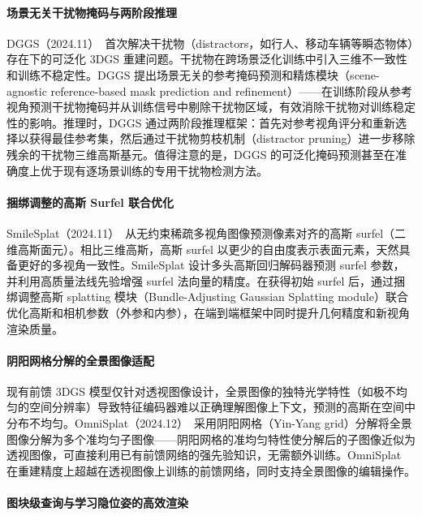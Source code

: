 \paragraph{场景无关干扰物掩码与两阶段推理}

DGGS（2024.11）~\cite{2411_17605}首次解决干扰物（distractors，如行人、移动车辆等瞬态物体）存在下的可泛化 3DGS 重建问题。干扰物在跨场景泛化训练中引入三维不一致性和训练不稳定性。DGGS 提出场景无关的参考掩码预测和精炼模块（scene-agnostic reference-based mask prediction and refinement）——在训练阶段从参考视角预测干扰物掩码并从训练信号中剔除干扰物区域，有效消除干扰物对训练稳定性的影响。推理时，DGGS 通过两阶段推理框架：首先对参考视角评分和重新选择以获得最佳参考集，然后通过干扰物剪枝机制（distractor pruning）进一步移除残余的干扰物三维高斯基元。值得注意的是，DGGS 的可泛化掩码预测甚至在准确度上优于现有逐场景训练的专用干扰物检测方法。

\paragraph{捆绑调整的高斯 Surfel 联合优化}

SmileSplat（2024.11）~\cite{2411_18072}从无约束稀疏多视角图像预测像素对齐的高斯 surfel（二维高斯面元）。相比三维高斯，高斯 surfel 以更少的自由度表示表面元素，天然具备更好的多视角一致性。SmileSplat 设计多头高斯回归解码器预测 surfel 参数，并利用高质量法线先验增强 surfel 法向量的精度。在获得初始 surfel 后，通过捆绑调整高斯 splatting 模块（Bundle-Adjusting Gaussian Splatting module）联合优化高斯和相机参数（外参和内参），在端到端框架中同时提升几何精度和新视角渲染质量。

\paragraph{阴阳网格分解的全景图像适配}

现有前馈 3DGS 模型仅针对透视图像设计，全景图像的独特光学特性（如极不均匀的空间分辨率）导致特征编码器难以正确理解图像上下文，预测的高斯在空间中分布不均匀。OmniSplat（2024.12）~\cite{2412_16604}采用阴阳网格（Yin-Yang grid）分解将全景图像分解为多个准均匀子图像——阴阳网格的准均匀特性使分解后的子图像近似为透视图像，可直接利用已有前馈网络的强先验知识，无需额外训练。OmniSplat 在重建精度上超越在透视图像上训练的前馈网络，同时支持全景图像的编辑操作。

\paragraph{图块级查询与学习隐位姿的高效渲染}

